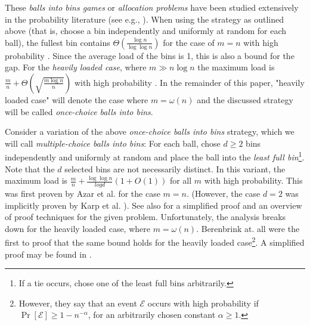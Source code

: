 \documentclass{acm_proc_article-sp}
\begin{document}
These \emph{balls into bins games} or \emph{allocation problems} have been studied extensively in the probability literature (see e.g., \cite{JK77}). When using the strategy as outlined above (that is, choose a bin independently and uniformly at random for each ball), the fullest bin contains $\Theta \left( \frac{\log n}{\log \log n} \right)$ for the case of $m = n$ with high probability \cite{RS98}. Since the average load of the bins is 1, this is also a bound for the gap. %
For the \emph{heavily loaded case}, where $m \gg n \log n$ the maximum load is $\frac{m}{n} + \Theta\left(\sqrt{\frac{m \log n}{n}}\right)$ with high probability \cite{RS98}. In the remainder of this paper, "heavily loaded case" will denote the case where $m = \omega\left(n\right)$ and the discussed strategy will be called \emph{once-choice balls into bins}.

Consider a variation of the above \emph{once-choice balls into bins} strategy, which we will call \emph{multiple-choice balls into bins}: For each ball, chose $d \geq 2$ bins independently and uniformly at random and place the ball into the \emph{least full bin}\footnote{If a tie occurs, chose one of the least full bins arbitrarily.}. Note that the $d$ selected bins are not necessarily distinct. In this variant, the maximum load is $\frac{m}{n} + \frac{\log \log n}{log d} \left( 1 + O\left(1\right)\right)$ for all $m$ with high probability. This was first proven by Azar et al. \cite{ABKU99} for the case $m = n$. (However, the case $d = 2$ was implicitly proven by Karp et al. \cite{KLM92}). See also \cite{RMS01} for a simplified proof and an overview of proof techniques for the given problem.  Unfortunately, the analysis breaks down for the heavily loaded case, where $m = \omega\left(n\right)$. Berenbrink at. all \cite{BFZR08} were the first to proof that the same bound holds for the heavily loaded case\footnote{However, they say that an event $\mathcal E$ occurs with high probability if $\Pr\left[\mathcal E \right]  \geq 1- n^{-\alpha}$, for an arbitrarily chosen constant $\alpha \geq 1$.}. A simplified proof may be found in \cite{TW13}. 
\end{document}
